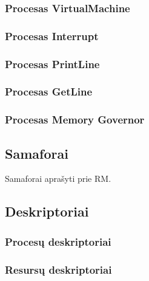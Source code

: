 \subsubsection{Procesas VirtualMachine}

\subsubsection{Procesas Interrupt}

\subsubsection{Procesas PrintLine}

\subsubsection{Procesas GetLine}

\subsubsection{Procesas Memory Governor}

\subsection{Samaforai}
Samaforai aprašyti prie RM.

\subsection{Deskriptoriai}

\subsubsection{Procesų deskriptoriai}

\subsubsection{Resursų deskriptoriai}

